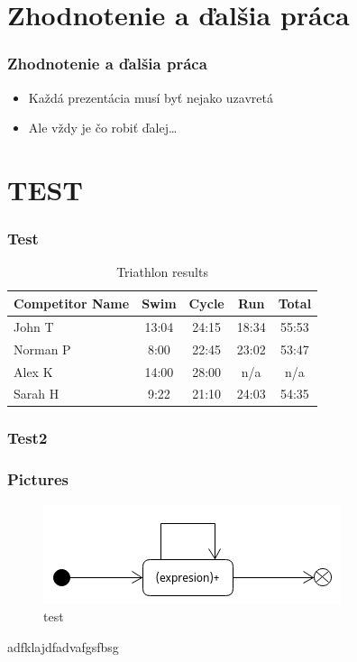 \documentclass{beamer}
\begin{document}
\section*{Zhodnotenie a ďalšia práca}

\begin{frame}[fragile=singleslide]\frametitle{Zhodnotenie a ďalšia práca}
	\begin{itemize}
		\item Každá prezentácia musí byť nejako uzavretá
		\item Ale vždy je čo robiť ďalej\ldots{}
	\end{itemize}
\end{frame}

\section*{TEST}

\begin{frame}[fragile=singleslide]\frametitle{Test}
	\begin{table}
		\begin{tabular}{l | c | c | c | c }
			Competitor Name & Swim  & Cycle & Run   & Total \\
			\hline \hline
			John T          & 13:04 & 24:15 & 18:34 & 55:53 \\
			Norman P        & 8:00  & 22:45 & 23:02 & 53:47 \\
			Alex K          & 14:00 & 28:00 & n/a   & n/a   \\
			Sarah H         & 9:22  & 21:10 & 24:03 & 54:35
		\end{tabular}
		\caption{Triathlon results}
	\end{table}
\end{frame}

\begin{frame}[fragile=singleslide]\frametitle{Test2}
	\frametitle{Pictures}
	\begin{figure}
		\includegraphics[scale=0.5]{Diagram2.png}
		\caption{test}
	\end{figure}
	adfklajdfadvafgsfbsg
\end{frame}
\end{document}
